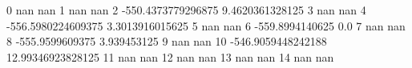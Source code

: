 0 nan nan
1 nan nan
2 -550.4373779296875 9.4620361328125
3 nan nan
4 -556.5980224609375 3.3013916015625
5 nan nan
6 -559.8994140625 0.0
7 nan nan
8 -555.9599609375 3.939453125
9 nan nan
10 -546.9059448242188 12.99346923828125
11 nan nan
12 nan nan
13 nan nan
14 nan nan
